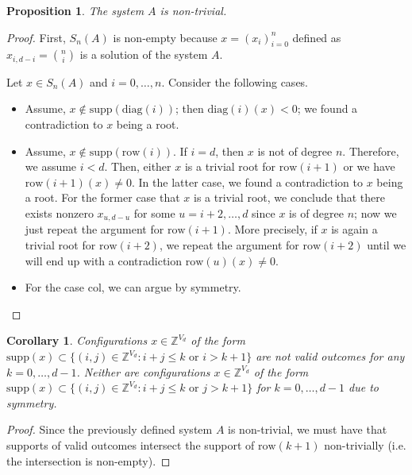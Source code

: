 \documentclass[11pt]{article}
\newtheorem{proposition}[theorem]{Proposition}
\newtheorem{corollary}[theorem]{Corollary}
\begin{document}
\begin{proposition}
  The system $A$ is non-trivial.
\end{proposition}

\begin{proof}
  First, $S_{n}(A)$ is non-empty because $x = (x_{i})_{i=0}^n$ defined as $x_{i, d-i} = {n \choose i}$ is a solution of the system $A$. 

  Let $x \in S_{n}(A)$ and $i = 0, \dots, n$. Consider the following cases.
  \begin{itemize}
    \item Assume, $x \notin \mathrm{supp}(\mathrm{diag}(i))$; then $\mathrm{diag}(i)(x) < 0$; we found a contradiction to $x$ being a root. 
    \item Assume, $x \notin \mathrm{supp}(\mathrm{row}(i))$. If $i = d$, then $x$ is not of degree $n$. Therefore, we assume $i < d$. Then, either $x$ is a trivial root for $\mathrm{row}(i+1)$ or we have $\mathrm{row}(i+1)(x) \neq 0$. In the latter case, we found a contradiction to $x$ being a root. For the former case that $x$ is a trivial root, we conclude that there exists nonzero $x_{u, d-u}$ for some $u = i+2, \dots, d$ since $x$ is of degree $n$; now we just repeat the argument for $\mathrm{row}(i+1)$. More precisely, if $x$ is again a trivial root for $\mathrm{row}(i+2)$, we repeat the argument for $\mathrm{row}(i+2)$ until we will end up with a contradiction $\mathrm{row}(u)(x) \neq 0$.
    \item For the case $\mathrm{col}$, we can argue by symmetry.
  \end{itemize}
\end{proof}

\begin{corollary}
  Configurations $x \in \mathbb{Z}^{V_{d}}$ of the form $\mathrm{supp}(x) \subset \{ (i,j) \in \mathbb{Z}^{V_{d}} : i + j \leq k \text{ or } i > k + 1 \}$ are not valid outcomes for any $k = 0, \dots, d-1$. Neither are configurations $x \in \mathbb{Z}^{V_{d}}$ of the form $\mathrm{supp}(x) \subset \{ (i,j) \in \mathbb{Z}^{V_{d}} : i + j \leq k \text{ or } j > k + 1 \}$ for $k = 0, \dots, d-1$ due to symmetry.
\end{corollary}

\begin{proof}
  Since the previously defined system $A$ is non-trivial, we must have that supports of valid outcomes intersect the support of $\mathrm{row}(k+1)$ non-trivially (i.e. the intersection is non-empty).
\end{proof}
\end{document}
